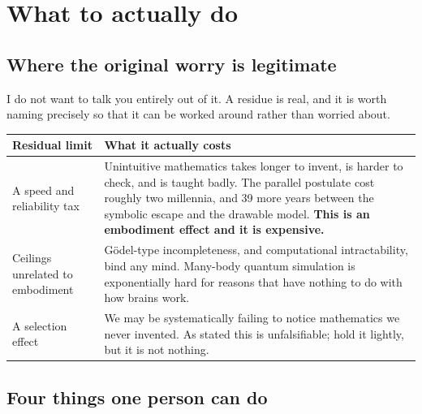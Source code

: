 \clearpage
\renewcommand{\sectioncolor}{bio}
\section{What to actually do}\label{sec:do}

\subsection{Where the original worry is legitimate}

I do not want to talk you entirely out of it. A residue is real, and it is worth naming precisely so
that it can be worked around rather than worried about.

\begin{center}\small
\begin{tabular}{@{}>{\raggedright\arraybackslash}p{5.3cm}>{\raggedright\arraybackslash}p{11.4cm}@{}}
\toprule
\rowcolor{crimson!11}
\textbf{\color{crimson}Residual limit} & \textbf{\color{crimson}What it actually costs}\\
\midrule
A speed and reliability tax &
 Unintuitive mathematics takes longer to invent, is harder to check, and is taught badly. The
 parallel postulate cost roughly two millennia, and 39 more years between the symbolic escape and
 the drawable model. \textbf{This is an embodiment effect and it is expensive.}\\
Ceilings unrelated to embodiment &
 Gödel-type incompleteness, and computational intractability, bind any mind. Many-body quantum
 simulation is exponentially hard for reasons that have nothing to do with how brains work.\\
\rowcolor{crimson!6}
A selection effect &
 We may be systematically failing to notice mathematics we never invented. As stated this is
 unfalsifiable; hold it lightly, but it is not nothing.\\
\bottomrule
\end{tabular}
\end{center}

\subsection{Four things one person can do}

